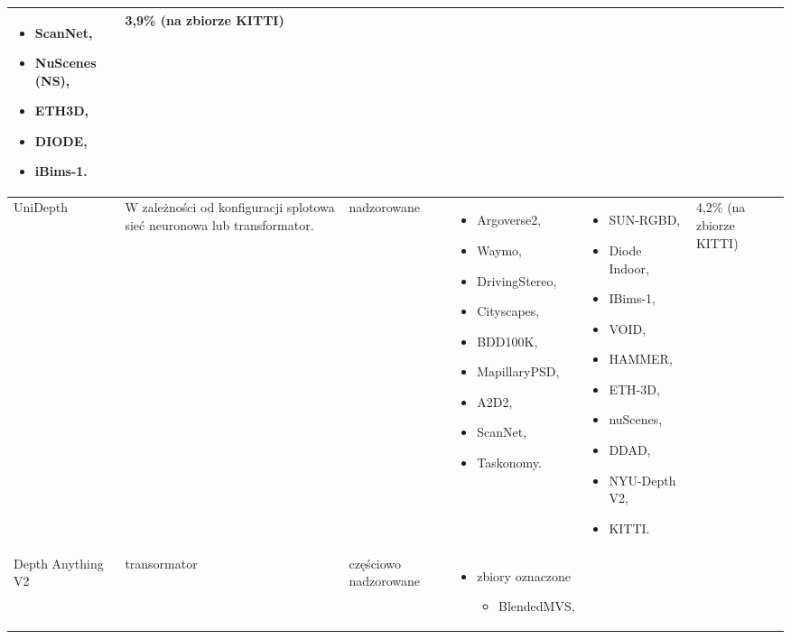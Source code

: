 \begin{table}[H]
{\begin{tabular}{ |l|p{2cm}|p{2cm}|p{5cm}|p{5cm}|p{2cm}| }
\begin{itemize}
            \item ScanNet,
            \item NuScenes (NS),
            \item ETH3D,
            \item DIODE,
            \item iBims-1.
        \end{itemize} &
        3,9\% (na zbiorze KITTI)\\
        \hline
        UniDepth \cite{piccinelli2024} &
        W zależności od konfiguracji splotowa sieć neuronowa lub transformator. &
        nadzorowane &
        \begin{itemize}
        \item Argoverse2,
        \item Waymo,
        \item DrivingStereo,
        \item Cityscapes,
        \item BDD100K,
        \item MapillaryPSD,
        \item A2D2,
        \item ScanNet,
        \item Taskonomy.
        \end{itemize} & 
        \begin{itemize} 
            \item SUN-RGBD,
            \item Diode Indoor,
            \item IBims-1,
            \item VOID,
            \item HAMMER,
            \item ETH-3D,
            \item nuScenes,
            \item DDAD,
            \item NYU-Depth V2,
            \item KITTI.
        \end{itemize} &
        4,2\% (na zbiorze KITTI)\\
        \hline
        Depth Anything V2 \cite{yang2024depth} &
        transormator &
        częściowo nadzorowane &
        \begin{itemize}
        \item zbiory oznaczone
            \begin{itemize}
                \item BlendedMVS,

\end{itemize}
\end{itemize}
\end{tabular}}
\end{table}
